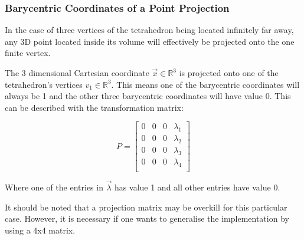 \subsubsection{Barycentric Coordinates of a Point Projection}

In the case of three vertices of  the  tetrahedron  being located infinitely far
away, any 3D point located  inside its volume will effectively be projected onto
the one finite vertex.

The  3  dimensional Cartesian coordinate $\vec{x}\in\mathbb{R}^3$  is  projected
onto one of the tetrahedron's vertices $v_1 \in \mathbb{R}^3$. This means one of
the  barycentric  coordinates will always be 1 and the other  three  barycentric
coordinates will have value 0.  This  can  be  described with the transformation
matrix:

\begin{equation}
    \label{eq:point}
    P = \begin{bmatrix}
        0 & 0 & 0 & \lambda_1 \\
        0 & 0 & 0 & \lambda_2 \\
        0 & 0 & 0 & \lambda_3 \\
        0 & 0 & 0 & \lambda_4 \\
    \end{bmatrix}
\end{equation}

Where one of the entries in $\vec{\lambda}$ has  value  1  and all other entries
have value 0.

It should be noted that a projection  matrix may be overkill for this particular
case. However, it is necessary if one wants to generalise  the implementation by
using a 4x4 matrix.

